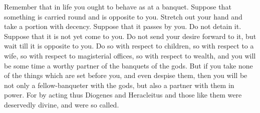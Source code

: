 Remember  that in  life you  ought  to behave  as  at a  banquet. Suppose  that
something is carried  round and is opposite  to you. Stretch out  your hand and
take a portion with  decency. Suppose that it passes by you.  Do not detain it.
Suppose that it is not yet come to  you. Do not send your desire forward to it,
but wait till  it is opposite to you.  Do so with respect to  children, so with
respect to a wife,  so with respect to magisterial offices,  so with respect to
wealth, and you will be some time a worthy partner of the banquets of the gods.
But if you take  none of the things which are set before  you, and even despise
them, then you  will be not only  a fellow-banqueter with the gods,  but also a
partner with  them in power.  For by acting  thus Diogenes and  Heracleitus and
those like them were deservedly divine, and were so called.
